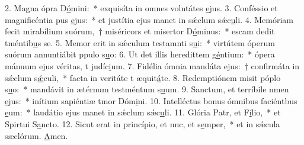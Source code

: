 2. Magna ópra D\uline{ó}mini:~* exquisíta in omnes volntátes \uline{e}jus.
3. Conféssio et magnificéntia pus \uline{e}jus:~* et justítia ejus manet in sǽclum sǽc\uline{u}li.
4. Memóriam fecit mirabílium suórum,~† miséricors et misertor D\uline{ó}minus:~* escam dedit tméntib\uline{u}s se.
5. Memor erit in sǽculum testamnti s\uline{u}i:~* virtútem óperum suórum annuntiábit ppulo s\uline{u}o:
6. Ut det illis heredittem g\uline{é}ntium:~* ópera mánuum ejus véritas, t judíc\uline{i}um.
7. Fidélia ómnia mandáta ejus:~† confirmáta in sǽclum s\uline{ǽ}culi,~* facta in veritáte t æquit\uline{á}te.
8. Redemptiónem misit póplo s\uline{u}o:~* mandávit in ætérnum testméntum s\uline{u}um.
9. Sanctum, et terríbile nmen \uline{e}jus:~* inítium sapiéntiæ tmor Dóm\uline{i}ni.
10. Intelléctus bonus ómnibus faciéntbus \uline{e}um:~* laudátio ejus manet in sǽclum sǽc\uline{u}li.
11. Glória Patr, et F\uline{í}lio,~* et Spirtui S\uline{a}ncto.
12. Sicut erat in princípio, et nnc, et s\uline{e}mper,~* et in sǽcula sæclórum. \uline{A}men.
